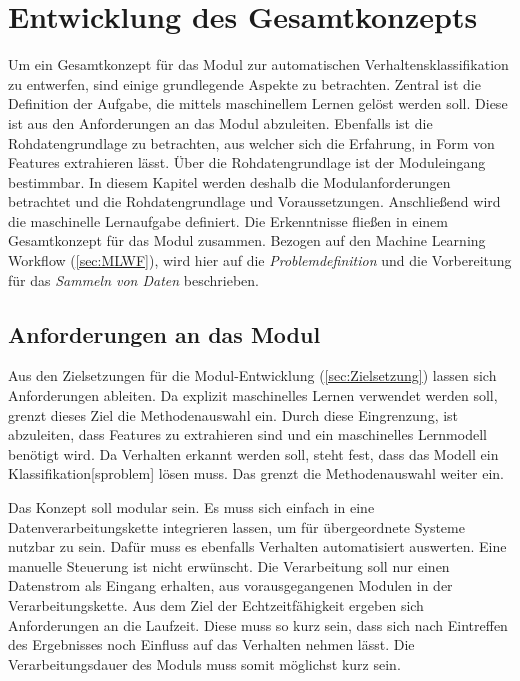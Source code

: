 \section{Entwicklung des Gesamtkonzepts} \label{sec:Meth gesamtkonzept}
Um ein Gesamtkonzept für das \gls{Modul} zur automatischen Verhaltensklassifikation zu entwerfen, sind einige grundlegende Aspekte zu betrachten. Zentral ist die Definition der Aufgabe, die mittels maschinellem Lernen gelöst werden soll. Diese ist aus den Anforderungen an das \gls{Modul} abzuleiten. Ebenfalls ist die Rohdatengrundlage zu betrachten, aus welcher sich die Erfahrung, in Form von Features extrahieren lässt. Über die Rohdatengrundlage ist der Moduleingang bestimmbar. In diesem Kapitel werden deshalb die Modulanforderungen betrachtet und die Rohdatengrundlage und Voraussetzungen. Anschließend wird die maschinelle Lernaufgabe definiert. Die Erkenntnisse fließen in einem Gesamtkonzept für das Modul zusammen. Bezogen auf den \gls{Machine Learning Workflow} (\autoref{sec:MLWF}), wird hier auf  die \textit{Problemdefinition} und die Vorbereitung für das \textit{Sammeln von Daten} beschrieben. \par


\subsection{Anforderungen an das Modul} \label{sec:Meth Anforderungen}

Aus den Zielsetzungen für die Modul-Entwicklung (\autoref{sec:Zielsetzung}) lassen sich Anforderungen ableiten. Da explizit maschinelles Lernen verwendet werden soll, grenzt dieses Ziel die Methodenauswahl ein. Durch diese Eingrenzung, ist abzuleiten, dass Features zu extrahieren sind und ein maschinelles Lernmodell benötigt wird. Da Verhalten erkannt werden soll, steht fest, dass das Modell ein \gls{Klassifikation}[sproblem] lösen muss. Das grenzt die Methodenauswahl weiter ein. \par

 Das Konzept soll modular sein. Es muss sich einfach in eine Datenverarbeitungskette integrieren lassen, um für übergeordnete Systeme nutzbar zu sein. Dafür muss es ebenfalls Verhalten automatisiert auswerten. Eine manuelle Steuerung ist nicht erwünscht. Die Verarbeitung soll nur einen Datenstrom als Eingang erhalten, aus vorausgegangenen Modulen in der Verarbeitungskette. Aus dem Ziel der Echtzeitfähigkeit ergeben sich Anforderungen an die Laufzeit. Diese muss so kurz sein, dass sich nach Eintreffen des Ergebnisses noch Einfluss auf das Verhalten nehmen lässt. Die Verarbeitungsdauer des Moduls muss somit möglichst kurz sein. \par

